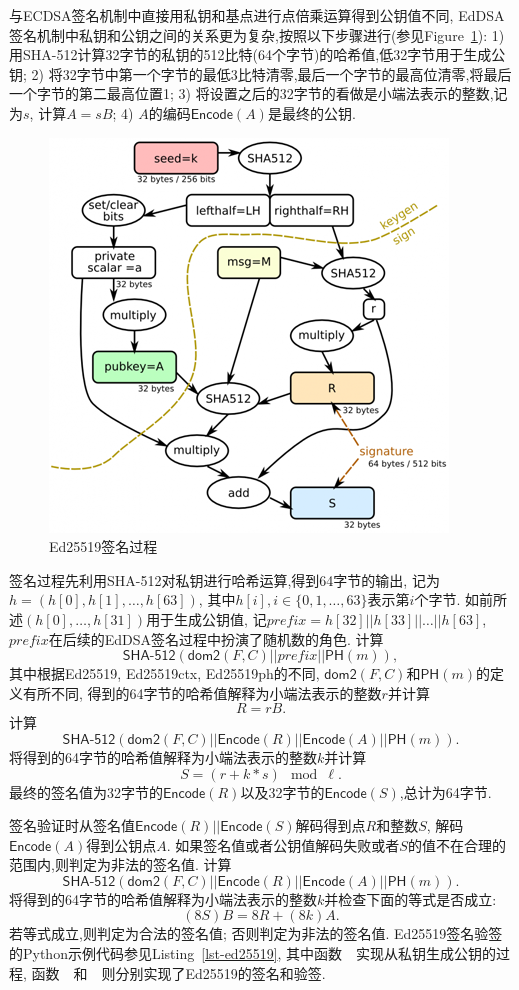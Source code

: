 与ECDSA签名机制中直接用私钥和基点进行点倍乘运算得到公钥值不同,
EdDSA签名机制中私钥和公钥之间的关系更为复杂,按照以下步骤进行(参见Figure~\ref{fig-ed25519}):
1) 用\textsf{SHA-512}计算32字节的私钥的512比特(64个字节)的哈希值,低32字节用于生成公钥;
2) 将32字节中第一个字节的最低3比特清零,最后一个字节的最高位清零,将最后一个字节的第二最高位置1;
3) 将设置之后的32字节的看做是小端法表示的整数,记为$s$, 计算$A = sB$;
4) $A$的编码$\textsf{Encode}(A)$是最终的公钥.

\begin{figure}[h]
\centering
\includegraphics[width=.7\textwidth]{ed25519.png}
\caption{Ed25519签名过程}\label{fig-ed25519}
\end{figure}

签名过程先利用\textsf{SHA-512}对私钥进行哈希运算,得到64字节的输出,
记为$h = (h[0], h[1], \ldots, h[63])$, 其中$h[i], i \in \{0, 1, \ldots, 63\}$表示第$i$个字节.
如前所述$(h[0], \ldots, h[31])$用于生成公钥值, 记$prefix = h[32] || h[33] || \ldots || h[63]$, 
$prefix$在后续的EdDSA签名过程中扮演了随机数的角色.
计算
$$\textsf{SHA-512}(\textsf{dom2}(F, C) || prefix || \textsf{PH}(m)),$$
其中根据\textsf{Ed25519}, \textsf{Ed25519ctx}, \textsf{Ed25519ph}的不同,
$\textsf{dom2}(F,C)$和$\textsf{PH}(m)$的定义有所不同,
得到的64字节的哈希值解释为小端法表示的整数$r$并计算
$$R = rB.$$
计算
$$\textsf{SHA-512}\left(\textsf{dom2}(F,C) || \textsf{Encode}(R) || \textsf{Encode}(A) || \textsf{PH}(m)\right).$$
将得到的64字节的哈希值解释为小端法表示的整数$k$并计算
$$ S = (r + k * s) \mod \ell.$$
最终的签名值为32字节的$\textsf{Encode}(R)$以及32字节的$\textsf{Encode}(S)$,总计为64字节.

签名验证时从签名值$\textsf{Encode}(R)||\textsf{Encode}(S)$解码得到点$R$和整数$S$,
解码$\textsf{Encode}(A)$得到公钥点$A$.
如果签名值或者公钥值解码失败或者$S$的值不在合理的范围内,则判定为非法的签名值.
计算
$$\textsf{SHA-512}\left(\textsf{dom2}(F,C) || \textsf{Encode}(R) || \textsf{Encode}(A) || \textsf{PH}(m)\right).$$
将得到的64字节的哈希值解释为小端法表示的整数$k$并检查下面的等式是否成立:
$$(8S)B = 8R + (8k)A.$$
若等式成立,则判定为合法的签名值; 否则判定为非法的签名值.
\textsf{Ed25519}签名验签的Python示例代码参见Listing~\ref{lst-ed25519},
其中函数~~实现从私钥生成公钥的过程,
函数~~和~~则分别实现了Ed25519的签名和验签.

